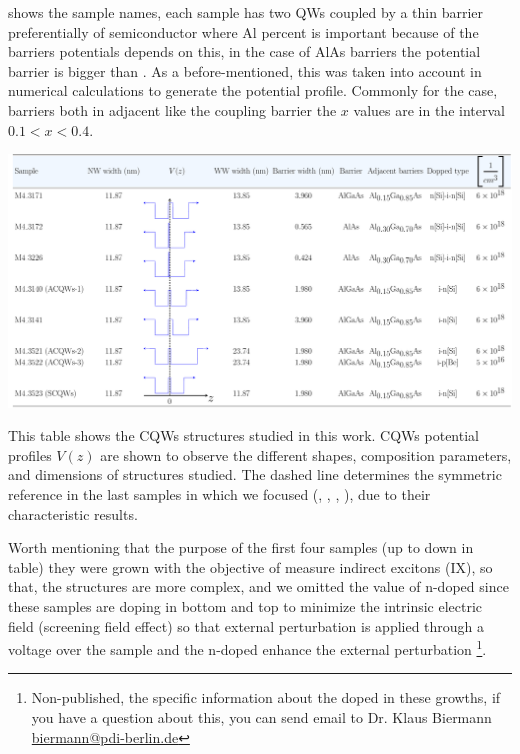  shows the sample names, each sample has two QWs coupled by a thin barrier preferentially of \algaas semiconductor where Al percent is important because of the barriers potentials depends on this, in the case of AlAs barriers the potential barrier is bigger than \algaas. As a before-mentioned, this was taken into account in numerical calculations to generate the potential profile. Commonly for the case, \algaas barriers both in adjacent like the coupling barrier the $x$ values are in the interval $0.1<x<0.4$.
\begin{landscape}
	\begin{table}
		\centering
		\includegraphics[width=\textwidth]{../tables/chapter-3/table-1-samples/out/table-1-samples.pdf}
		\caption[Table of samples description]{This table shows the CQWs structures studied in this work.  CQWs potential profiles $V(z)$ are shown to observe the different shapes, composition parameters, and dimensions of structures studied. The dashed line determines the symmetric reference in the last samples in which we focused (\tucu, \tcvu, \tcvd, \tcvt), due to their characteristic results. }
		\label{tab:chapter3:Samples description} 
	\end{table}
\end{landscape}
 Worth mentioning that the purpose of the first four samples (up to down in table) they were grown with the objective of measure indirect excitons (IX), so that,  the structures are more complex, and we omitted the value of n-doped since these samples are doping in bottom and top to minimize the intrinsic electric field (screening field effect) so that external perturbation is applied through a voltage over the sample\cite{yuan2018tunneling} and the n-doped enhance the external perturbation \footnote{Non-published, the specific information about the doped  in these growths, if you have a question about this, you can send email to Dr. Klaus Biermann \url{biermann@pdi-berlin.de}}. 

